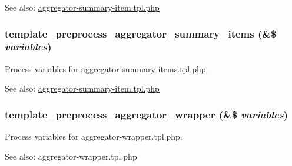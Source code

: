 \begin{Desc}
\item[See also:]\hyperlink{aggregator-summary-item_8tpl_8php}{aggregator-summary-item.tpl.php} \end{Desc}
\hypertarget{aggregator_8pages_8inc_f80643fa6f8b742a431aed61576606dd}{
\subsubsection[{template\_\-preprocess\_\-aggregator\_\-summary\_\-items}]{\setlength{\rightskip}{0pt plus 5cm}template\_\-preprocess\_\-aggregator\_\-summary\_\-items (\&\$ {\em variables})}}
\label{aggregator_8pages_8inc_f80643fa6f8b742a431aed61576606dd}


Process variables for \hyperlink{aggregator-summary-items_8tpl_8php}{aggregator-summary-items.tpl.php}.

\begin{Desc}
\item[See also:]\hyperlink{aggregator-summary-item_8tpl_8php}{aggregator-summary-item.tpl.php} \end{Desc}
\hypertarget{aggregator_8pages_8inc_95bcd00a54c249668f911199fa8021ba}{
\subsubsection[{template\_\-preprocess\_\-aggregator\_\-wrapper}]{\setlength{\rightskip}{0pt plus 5cm}template\_\-preprocess\_\-aggregator\_\-wrapper (\&\$ {\em variables})}}
\label{aggregator_8pages_8inc_95bcd00a54c249668f911199fa8021ba}


Process variables for aggregator-wrapper.tpl.php.

\begin{Desc}
\item[See also:]aggregator-wrapper.tpl.php \end{Desc}
